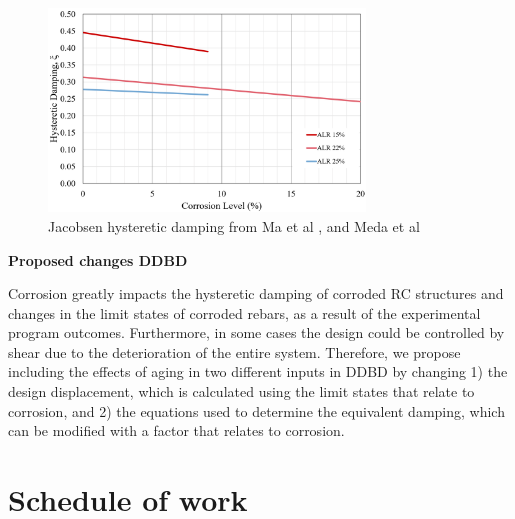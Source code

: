 \begin{figure}[htbp]
	\centering
    \includegraphics[width=0.75\textwidth]{VAC Prelim 2.0/Chapter-5/figs/HystereticDampingLitResults.png}
	\caption{Jacobsen hysteretic damping from Ma et al \cite{Ma2012}, and Meda et al \cite{Meda2014}}
	\label{fig:JacobsenResults}
\end{figure}

\textbf{Proposed changes DDBD}

Corrosion greatly impacts the hysteretic damping of corroded RC structures and changes in the limit states of corroded rebars, as a result of the experimental program outcomes. Furthermore, in some cases the design could be controlled by shear due to the deterioration of the entire system. Therefore, we propose including the effects of aging in two different inputs in DDBD by changing 1) the design displacement, which is calculated using the limit states that relate to corrosion, and 2) the equations used to determine the equivalent damping, which can be modified with a factor that relates to corrosion.
\newpage
\section{Schedule of work}